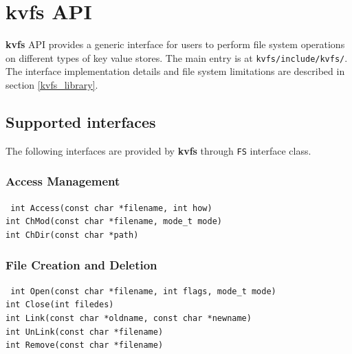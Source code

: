 \documentclass[bsc,frontabs,twoside,singlespacing,parskip,deptreport]{infthesis}     %
\begin{document}
{\section{kvfs API}
{\bf kvfs} API provides a generic interface for users to perform file system operations on different types of key value stores. The main entry is at 
{\tt kvfs/include/kvfs/}.
The interface implementation details and file system limitations are described in section \ref{kvfs_library}.
\subsection{Supported interfaces}
The following interfaces are provided by {\bf kvfs} through {\tt FS} interface class.
\subsubsection{Access Management}
{\tt
	int Access(const char *filename, int how)
	\\
	int ChMod(const char *filename, mode\_t mode)
	\\
	int ChDir(const char *path)
}
\subsubsection{File Creation and Deletion}
{\tt
	int Open(const char *filename, int flags, mode\_t mode)
	\\
	int Close(int filedes)
	\\
	int Link(const char *oldname, const char *newname)
	\\
	int UnLink(const char *filename)
	\\
	int Remove(const char *filename)
}
\\
}
\end{document}
